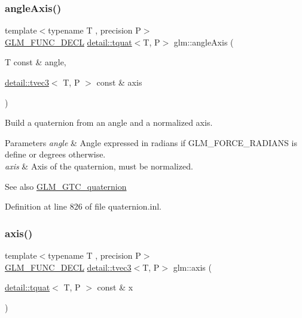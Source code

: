 \subsubsection{\texorpdfstring{angle\+Axis()}{angleAxis()}}
{\footnotesize\ttfamily template$<$typename T , precision P$>$ \\
\hyperlink{setup_8hpp_ab2d052de21a70539923e9bcbf6e83a51}{G\+L\+M\+\_\+\+F\+U\+N\+C\+\_\+\+D\+E\+CL} \hyperlink{structglm_1_1detail_1_1tquat}{detail\+::tquat}$<$T, P$>$ glm\+::angle\+Axis (\begin{DoxyParamCaption}\item[{T const \&}]{angle,  }\item[{\hyperlink{structglm_1_1detail_1_1tvec3}{detail\+::tvec3}$<$ T, P $>$ const \&}]{axis }\end{DoxyParamCaption})}

Build a quaternion from an angle and a normalized axis.


\begin{DoxyParams}{Parameters}
{\em angle} & Angle expressed in radians if G\+L\+M\+\_\+\+F\+O\+R\+C\+E\+\_\+\+R\+A\+D\+I\+A\+NS is define or degrees otherwise. \\
\hline
{\em axis} & Axis of the quaternion, must be normalized.\\
\hline
\end{DoxyParams}
\begin{DoxySeeAlso}{See also}
\hyperlink{group__gtc__quaternion}{G\+L\+M\+\_\+\+G\+T\+C\+\_\+quaternion} 
\end{DoxySeeAlso}


Definition at line 826 of file quaternion.\+inl.

\mbox{\label{group__gtc__quaternion_ga8eef9f8c3f2e4836dccf09df975b20fb}} 
\subsubsection{\texorpdfstring{axis()}{axis()}}
{\footnotesize\ttfamily template$<$typename T , precision P$>$ \\
\hyperlink{setup_8hpp_ab2d052de21a70539923e9bcbf6e83a51}{G\+L\+M\+\_\+\+F\+U\+N\+C\+\_\+\+D\+E\+CL} \hyperlink{structglm_1_1detail_1_1tvec3}{detail\+::tvec3}$<$T, P$>$ glm\+::axis (\begin{DoxyParamCaption}\item[{\hyperlink{structglm_1_1detail_1_1tquat}{detail\+::tquat}$<$ T, P $>$ const \&}]{x }\end{DoxyParamCaption})}

